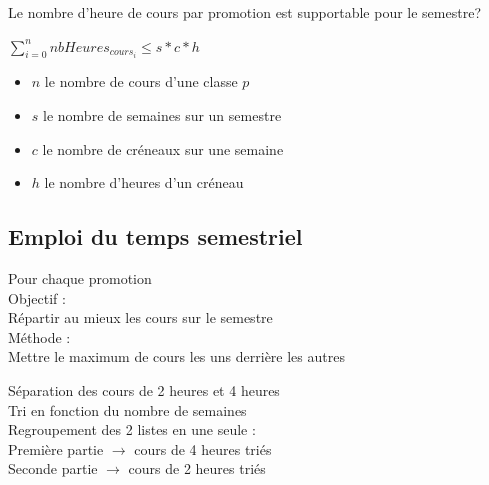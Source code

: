 \documentclass{beamer}
\begin{document}
\begin{frame}
Le nombre d'heure de cours par promotion est supportable pour le semestre?
\end{frame}

\begin{frame}
\begin{center}
$\sum_{i=0}^n nbHeures_{cours_i} \leq s*c*h$
\end{center}
\begin{itemize}
\item $n$ le nombre de cours d'une classe $p$
\item $s$ le nombre de semaines sur un semestre
\item $c$ le nombre de créneaux sur une semaine 
\item $h$ le nombre d'heures d'un créneau
\end{itemize}
\end{frame}


\subsection{Emploi du temps semestriel}
\begin{frame}
Pour chaque promotion \\
\vspace{\baselineskip}
Objectif : \\
Répartir au mieux les cours sur le semestre\\
\vspace{\baselineskip}
Méthode : \\
Mettre le maximum de cours les uns derrière les autres
\end{frame}

\begin{frame}
Séparation des cours de 2 heures et 4 heures\\
\vspace{\baselineskip}
Tri en fonction du nombre de semaines\\
\vspace{\baselineskip}
Regroupement des 2 listes en une seule : \\
Première partie $\rightarrow$ cours de 4 heures triés\\
Seconde partie $\rightarrow$ cours de 2 heures triés
\end{frame}
\end{document}

